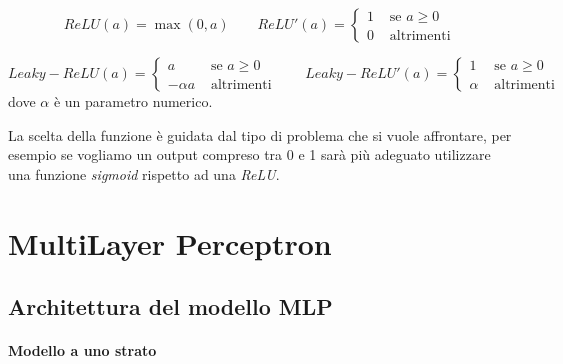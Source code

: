 \documentclass[11pt,a4paper,twoside,
openright]{book}
\begin{document}
\begin{equation}
ReLU(a) = \max(0,a) \qquad
ReLU'(a) = \begin{cases}
1 &\text{ se } a\geq0 \\
0 &\text{ altrimenti}
\end{cases}
\label{relu}
\end{equation}

\begin{equation}
Leaky-ReLU(a) = \begin{cases}
a &\text{ se } a\geq0 \\
- \alpha a &\text{ altrimenti}
\end{cases} \qquad
Leaky-ReLU'(a) = \begin{cases}
1 &\text{ se } a\geq0 \\
\alpha &\text{ altrimenti}
\end{cases}
\label{lrelu}
\end{equation}
dove $\alpha$ è un parametro numerico.

La scelta della funzione è guidata dal tipo di problema che si vuole affrontare, per esempio se vogliamo un output compreso tra 0 e 1 sarà più adeguato utilizzare una funzione \textit{sigmoid} rispetto ad una \textit{ReLU}.



\section{MultiLayer Perceptron}
\subsection{Architettura del modello MLP}
\paragraph{Modello a uno strato}
\def\layersep{2.5cm}
\end{document}
